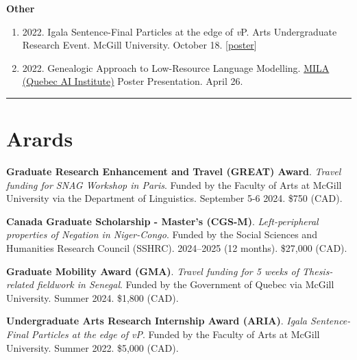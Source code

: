 \documentclass[margin,line]{resume}
\begin{document}
\begin{resume}
\begin{comment}
		\item[] {2022. \href{https://mcling.blogs.mcgill.ca/2022/03/27/mull-lab-03-30-brandon-chaperon/}{Igala's Dual Negation}. \href{https://mull-lab.org/}{MULL Lab} meeting. McGill University. March 30.}
	\end{enumerate}
\end{comment}

	\textbf{Other}
	\begin{enumerate}[-, leftmargin=1em, topsep=2pt]
		\item[] {2022. Igala Sentence-Final Particles at the edge of \textit{v}P. Arts Undergraduate Research Event. McGill University. October 18. [\href{https://www.mcgill.ca/arts-internships/files/arts-internships/brandon_chaperon.pdf}{poster}]}

		\item[] {2022. Genealogic Approach to Low-Resource Language Modelling. \href{https://mila.quebec/en/}{MILA (Quebec AI Institute)} Poster Presentation. April 26.}

	\end{enumerate}


	\vspace{-0.9em}\rule{\textwidth}{0.4pt}


		\vspace{-0.5em}

		\section{\mysidestyle Arards}

	
		{\textbf{Graduate Research Enhancement and Travel (GREAT) Award}. \textit{Travel funding for SNAG Workshop in Paris}. Funded by the Faculty of Arts at McGill University via the Department of Linguistics. September 5-6 2024. \$750 (CAD).}
	
		{\textbf{Canada Graduate Scholarship - Master's (CGS-M)}. \textit{Left-peripheral properties of Negation in Niger-Congo}. Funded by the Social Sciences and Humanities Research Council (SSHRC). 2024--2025 (12 months). \$27,000 (CAD).}
		
		{\textbf{Graduate Mobility Award (GMA)}. \textit{Travel funding for 5 weeks of Thesis-related fieldwork in Senegal}. Funded by the Government of Quebec via McGill University. %
		Summer 2024. \$1,800 (CAD).}	
		
		{\textbf{Undergraduate Arts Research Internship Award (ARIA)}. \textit{Igala Sentence-Final Particles at the edge of \textit{v}P}. Funded by the Faculty of Arts at McGill University. %
		Summer 2022. \$5,000 (CAD).}
	

\end{resume}
\end{document}
